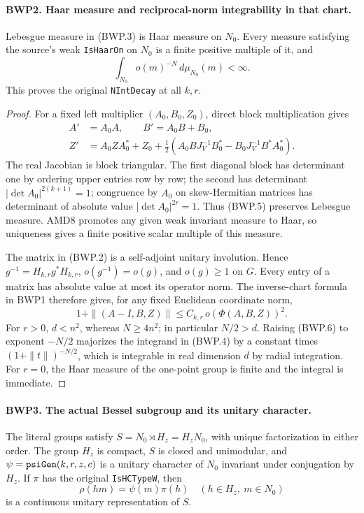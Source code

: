 \documentclass[11pt,a4paper]{article}
\numberwithin{equation}{section}
\theoremstyle{remark}\newtheorem{remark}[theorem]{Remark}
\begin{document}
\paragraph{BWP2. Haar measure and reciprocal-norm integrability in that chart.}
\label{claim:BWP2}
Lebesgue measure in (BWP.3) is Haar measure on \(N_0\).
Every measure satisfying the source's weak \texttt{Is\allowbreak Haar\allowbreak On}
on \(N_0\) is a finite positive multiple of it, and
\[
 \int_{N_0}o(m)^{-N}\,d\mu_{N_0}(m)<\infty.
 \tag{BWP.4}
\]
This proves the original \texttt{NInt\allowbreak Decay} at all \(k,r\).

\begin{proof}
For a fixed left multiplier \((A_0,B_0,Z_0)\), direct block
multiplication gives
\[
 \begin{split}
 A'&=A_0A,\qquad B'=A_0B+B_0,\\
 Z'&=A_0ZA_0^*+Z_0+
 \tfrac12(A_0BJ_V^{-1}B_0^*-B_0J_V^{-1}B^*A_0^*).
 \end{split}
 \tag{BWP.5}
\]
The real Jacobian is block triangular.  The first diagonal block
has determinant one by ordering upper entries row by row; the second
has determinant \(|\det A_0|^{2(k+1)}=1\); congruence by \(A_0\)
on skew-Hermitian matrices has determinant of absolute value
\(|\det A_0|^{2r}=1\).  Thus (BWP.5) preserves Lebesgue measure.
AMD8 promotes any given weak invariant measure to Haar, so uniqueness
gives a finite positive scalar multiple of this measure.

The matrix in (BWP.2) is a self-adjoint unitary involution.  Hence
\(g^{-1}=H_{k,r}g^*H_{k,r}\), \(o(g^{-1})=o(g)\), and
\(o(g)\ge1\) on \(G\).  Every entry of a matrix has absolute
value at most its operator norm.  The inverse-chart formula in BWP1
therefore gives, for any fixed Euclidean coordinate norm,
\[
 1+\|(A-I,B,Z)\|\le C_{k,r}\,o(\Phi(A,B,Z))^2.
 \tag{BWP.6}
\]
For \(r>0\), \(d< n^2\), whereas \(N\ge4n^2\); in
particular \(N/2>d\).  Raising (BWP.6) to exponent \(-N/2\)
majorizes the integrand in (BWP.4) by a constant times
\((1+\|t\|)^{-N/2}\), which is integrable in real dimension
\(d\) by radial integration.  For \(r=0\), the Haar measure
of the one-point group is finite and the integral is immediate.
\end{proof}

\paragraph{BWP3. The actual Bessel subgroup and its unitary character.}
\label{claim:BWP3}
The literal groups satisfy \(S=N_0\rtimes H_z=H_zN_0\), with
unique factorization in either order.  The group \(H_z\) is compact,
\(S\) is closed and unimodular, and
\(\psi=\texttt{psi\allowbreak Gen}(k,r,z,c)\) is a unitary character of
\(N_0\) invariant under conjugation by \(H_z\).  If \(\pi\)
has the original \texttt{Is\allowbreak HCType\allowbreak W}, then
\[
 \rho(hm)=\psi(m)\pi(h)\quad(h\in H_z,\ m\in N_0)
 \tag{BWP.7}
\]
is a continuous unitary representation of \(S\).
\end{document}
